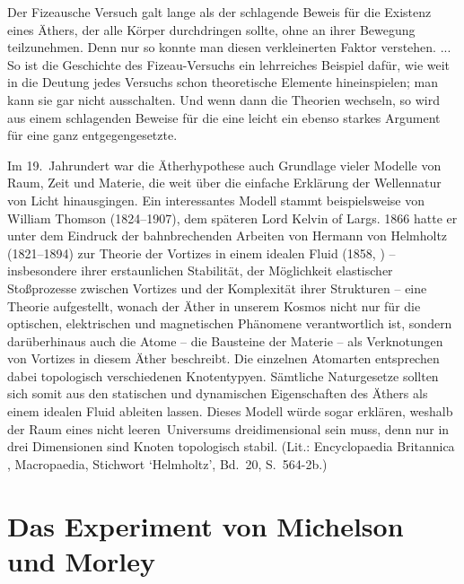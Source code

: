 \small
{}%
Der Fizeausche Versuch galt
lange als der schlagende Beweis f\"ur die Existenz eines \"Athers, der
alle K\"orper durchdringen sollte, ohne an ihrer Bewegung teilzunehmen.
Denn nur so konnte man diesen verkleinerten Faktor verstehen. ... So ist
die Geschichte des Fizeau-Versuchs ein lehrreiches Beispiel daf\"ur, wie
weit in die Deutung jedes Versuchs schon theoretische Elemente 
hineinspielen; man kann sie gar nicht ausschalten. Und wenn dann die 
Theorien wechseln, so wird aus einem schlagenden Beweise f\"ur die
eine leicht ein ebenso starkes Argument f\"ur eine ganz 
entgegengesetzte.
\vspace{0.3cm}

\normalsize
Im 19.\ Jahrundert war die \"Atherhypothese auch Grundlage vieler
Modelle von Raum, Zeit und Materie, die weit \"uber die einfache
Erkl\"arung der Wellennatur von Licht hinausgingen. Ein interessantes
Modell stammt beispielsweise von 
William Thomson (1824--1907), 
dem sp\"ateren Lord Kelvin of Largs. 1866 hatte er unter dem Eindruck 
der bahnbrechenden Arbeiten von  
Hermann von Helmholtz (1821--1894) zur Theorie der Vortizes in einem 
idealen Fluid (1858, \cite{Helmholtz2}) -- insbesondere ihrer
erstaunlichen Stabilit\"at, der M\"oglichkeit elastischer Sto\ss prozesse
zwischen Vortizes und der Komplexit\"at ihrer Strukturen -- eine Theorie
aufgestellt, wonach der \"Ather in unserem Kosmos nicht nur f\"ur die 
optischen, elektrischen und magnetischen Ph\"anomene verantwortlich ist, 
sondern dar\"uberhinaus auch die Atome -- die Bausteine der Materie -- 
als Verknotungen von Vortizes in diesem \"Ather beschreibt. Die 
einzelnen Atomarten entsprechen dabei topologisch verschiedenen 
Knotentypyen. S\"amtliche Naturgesetze sollten sich somit aus den 
statischen und dynamischen Eigenschaften des \"Athers als einem idealen 
Fluid ableiten lassen. Dieses Modell w\"urde sogar erkl\"aren, weshalb der
Raum eines \glqq nicht leeren\grqq\ Universums dreidimensional sein muss,
denn nur in drei Dimensionen sind Knoten topologisch stabil.
(Lit.: Encyclopaedia Britannica \cite{Britannica}, 
Macropaedia, Stichwort `Helmholtz', Bd.~20, S.~564-2b.)

\section{Das Experiment von Michelson und Morley}
\label{sec_Michelson}

